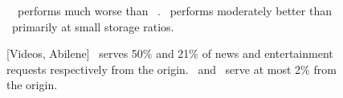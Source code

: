 \begin{figure}[t]
\begin{center}
\end{center}
\vspace{-0.2in}
\caption{\Planned\ \optrp\ performs much worse than \unplanned\  \invlru. \optrpfuture\ performs moderately better than \invlru\ primarily at small storage ratios.}
\vspace{-0.1in}
\label{fig:newmaingraphs}
\end{figure}



\begin{figure}[t]	
\begin{center}
\end{center}
\vspace{-0.2in}
\caption{[Videos, Abilene] \optrp\ serves 50\%  and 21\% of news and entertainment requests respectively from the origin. \invlru\ and \optrpfuture\ serve at most 2\% from the origin.}
\vspace{-0.15in}
\label{fig:originrequest}
\end{figure}


